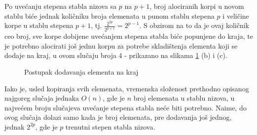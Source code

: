 \documentclass[a4paper]{article}
\begin{document}
Po uvećanju stepena stabla nizova sa $p$ na $p + 1$, broj alociranih korpi u novom stablu biće jednak količniku broja elemenata u punom stablu stepena $p$ i veličine korpe u stablu stepena $p + 1$, tj. $\frac{2^{2p}}{2^{p + 1}} = 2^{p - 1}$. S obzirom na to da je ovaj količnik ceo broj, sve korpe dobijene uvećanjem stepena stabla biće popunjene do kraja, te je potrebno alocirati još jednu korpu za potrebe skladištenja elementa koji se dodaje na kraj, u ovom slučaju broja 4 - prikazano na slikama \ref{fig:dodavanje-na-kraj-primer-postupak} (b) i (c).

\begin{figure}[h!]
    \centering
    \caption{Postupak dodavanja elementa na kraj}
    \label{fig:dodavanje-na-kraj-primer-postupak}
\end{figure}

Iako je, usled kopiranja svih elemenata, vremenska složenost prethodno opisanog najgoreg slučaja jednaka $O(n)$, gde je $n$ broj elemenata u stablu nizova, u najvećem broju slučajeva uvećanje stepena stabla neće biti potrebno. Naime, do ovog slučaja dolazi samo kada je broj elemenata, pre dodavanja još jednog, jednak $2^{2p}$, gde je $p$ trenutni stepen stabla nizova.
\end{document}
